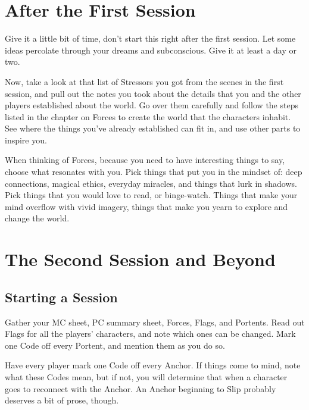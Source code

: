\documentclass[
  oneside,
  statementpaper,
  9pt]{memoir}
\begin{document}
\hypertarget{after-the-first-session}{%
\section{After the First Session}\label{after-the-first-session}}

Give it a little bit of time, don't start this right after the first
session. Let some ideas percolate through your dreams and subconscious.
Give it at least a day or two.

Now, take a look at that list of Stressors you got from the scenes in
the first session, and pull out the notes you took about the details
that you and the other players established about the world. Go over them
carefully and follow the steps listed in the chapter on Forces to create
the world that the characters inhabit. See where the things you've
already established can fit in, and use other parts to inspire you.

When thinking of Forces, because you need to have interesting things to
say, choose what resonates with you. Pick things that put you in the
mindset of: deep connections, magical ethics, everyday miracles, and
things that lurk in shadows. Pick things that you would love to read, or
binge-watch. Things that make your mind overflow with vivid imagery,
things that make you yearn to explore and change the world.

\hypertarget{the-second-session-and-beyond}{%
\section{The Second Session and
Beyond}\label{the-second-session-and-beyond}}

\hypertarget{starting-a-session-1}{%
\subsection{Starting a Session}\label{starting-a-session-1}}

Gather your MC sheet, PC summary sheet, Forces, Flags, and Portents.
Read out Flags for all the players' characters, and note which ones can
be changed. Mark one Code off every Portent, and mention them as you do
so.

Have every player mark one Code off every Anchor. If things come to
mind, note what these Codes mean, but if not, you will determine that
when a character goes to reconnect with the Anchor. An Anchor beginning
to Slip probably deserves a bit of prose, though.
\end{document}
